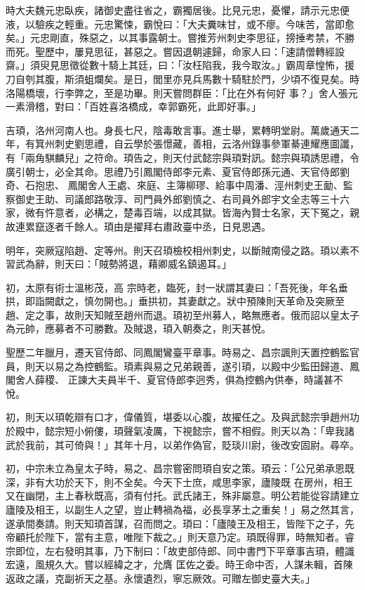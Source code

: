 \begin{pinyinscope}
 時大夫魏元忠臥疾，諸御史盡往省之，霸獨居後。比見元忠，憂懼，請示元忠便
 液，以驗疾之輕重。元忠驚悚，霸悅曰：「大夫糞味甘，或不瘳。今味苦，當即愈矣。」元忠剛直，殊惡之，以其事露朝士。嘗推芳州刺史李思征，搒捶考禁，不勝而死。聖歷中，屢見思征，甚惡之。嘗因退朝遽歸，命家人曰：「速請僧轉經設齋。」須臾見思徵從數十騎上其廷，曰：「汝枉陷我，我今取汝。」霸周章惶怖，援刀自刳其腹，斯須蛆爛矣。是日，閭里亦見兵馬數十騎駐於門，少頃不復見矣。時洛陽橋壞，行李弊之，至是功畢。則天嘗問群臣：「比在外有何好
 事？」舍人張元一素滑稽，對曰：「百姓喜洛橋成，幸郭霸死，此即好事。」



 吉頊，洛州河南人也。身長七尺，陰毒敢言事。進士舉，累轉明堂尉。萬歲通天二年，有箕州刺史劉思禮，自云學於張憬藏，善相，云洛州錄事參軍綦連耀應圖讖，有「兩角騏麟兒」之符命。頊告之，則天付武懿宗與頊對訊。懿宗與頊誘思禮，令廣引朝士，必全其命。思禮乃引鳳閣侍郎李元素、夏官侍郎孫元通、天官侍郎劉奇、石抱忠、
 鳳閣舍人王處、來庭、主簿柳璆、給事中周潘、涇州刺史王勔、監察御史王助、司議郎路敬淳、司門員外郎劉慎之、右司員外郎宇文全志等三十六家，微有忤意者，必構之，楚毒百端，以成其獄。皆海內賢士名家，天下冤之，親故連累竄逐者千餘人。頊由是擢拜右肅政臺中丞，日見恩遇。



 明年，突厥寇陷趙、定等州。則天召頊檢校相州刺史，以斷賊南侵之路。頊以素不習武為辭，則天曰：「賊勢將退，藉卿威名鎮遏耳。」



 初，太原有術士溫彬茂，高
 宗時老，臨死，封一狀謂其妻曰：「吾死後，年名垂拱，即詣闕獻之，慎勿開也。」垂拱初，其妻獻之。狀中預陳則天革命及突厥至趙、定之事，故則天知賊至趙州而退。頊初至州募人，略無應者。俄而詔以皇太子為元帥，應募者不可勝數。及賊退，頊入朝奏之，則天甚悅。



 聖歷二年臘月，遷天官侍郎、同鳳閣鸞臺平章事。時易之、昌宗諷則天置控鶴監官員，則天以易之為控鶴監。頊素與易之兄弟親善，遂引頊，以殿中少監田歸道、鳳閣舍人薛稷、
 正諫大夫員半千、夏官侍郎李迥秀，俱為控鶴內供奉，時議甚不悅。



 初，則天以頊乾辯有口才，偉儀質，堪委以心腹，故擢任之。及與武懿宗爭趙州功於殿中，懿宗短小俯僂，頊聲氣凌厲，下視懿宗，嘗不相假。則天以為：「卑我諸武於我前，其可倚與！」其年十月，以弟作偽官，貶琰川尉，後改安固尉。尋卒。



 初，中宗未立為皇太子時，易之、昌宗嘗密問頊自安之策。頊云：「公兄弟承恩既深，非有大功於天下，則不全矣。今天下士庶，咸思李家，廬陵既
 在房州，相王又在幽閉，主上春秋既高，須有付托。武氏諸王，殊非屬意。明公若能從容請建立廬陵及相王，以副生人之望，豈止轉禍為福，必長享茅土之重矣！」易之然其言，遂承間奏請。則天知頊首謀，召而問之。頊曰：「廬陵王及相王，皆陛下之子，先帝顧托於陛下，當有主意，唯陛下裁之。」則天意乃定。頊既得罪，時無知者。睿宗即位，左右發明其事，乃下制曰：「故吏部侍郎、同中書門下平章事吉頊，體識宏遠，風規久大。嘗以經緯之才，允膺
 匡佐之委。時王命中否，人謀未輯，首陳返政之議，克副祈天之基。永懷遺烈，寧忘厥效。可贈左御史臺大夫。」



\end{pinyinscope}
